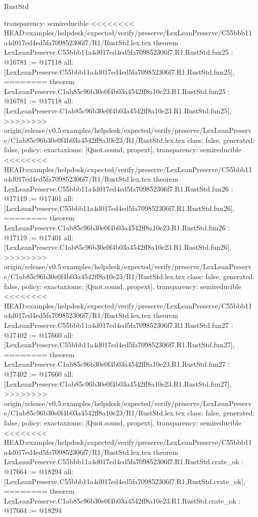 \begin{lexlean}{RustStd}
\begin{coremodule}
{\begin{coremodule}
{{{{{{{{{{{{{{{{{{{{{{{{{{{{  transparency: semireducible
}
<<<<<<<< HEAD:examples/helpdesk/expected/verify/preserve/LexLeanPreserve/C55bbb11a4d017ed4ed5fa709852306f7/R1/RustStd.lex.tex
theorem LexLeanPreserve.C55bbb11a4d017ed4ed5fa709852306f7.R1.RustStd.fun25 : @16781 := @17118 {
  all: [LexLeanPreserve.C55bbb11a4d017ed4ed5fa709852306f7.R1.RustStd.fun25],
========
theorem LexLeanPreserve.C1ab85c96b30e0f4b03a4542ff8a10e23.R1.RustStd.fun25 : @16781 := @17118 {
  all: [LexLeanPreserve.C1ab85c96b30e0f4b03a4542ff8a10e23.R1.RustStd.fun25],
>>>>>>>> origin/release/v0.5:examples/helpdesk/expected/verify/preserve/LexLeanPreserve/C1ab85c96b30e0f4b03a4542ff8a10e23/R1/RustStd.lex.tex
  class: false,
  generated: false,
  policy: exact{axioms: [Quot.sound, propext]},
  transparency: semireducible
}
<<<<<<<< HEAD:examples/helpdesk/expected/verify/preserve/LexLeanPreserve/C55bbb11a4d017ed4ed5fa709852306f7/R1/RustStd.lex.tex
theorem LexLeanPreserve.C55bbb11a4d017ed4ed5fa709852306f7.R1.RustStd.fun26 : @17119 := @17401 {
  all: [LexLeanPreserve.C55bbb11a4d017ed4ed5fa709852306f7.R1.RustStd.fun26],
========
theorem LexLeanPreserve.C1ab85c96b30e0f4b03a4542ff8a10e23.R1.RustStd.fun26 : @17119 := @17401 {
  all: [LexLeanPreserve.C1ab85c96b30e0f4b03a4542ff8a10e23.R1.RustStd.fun26],
>>>>>>>> origin/release/v0.5:examples/helpdesk/expected/verify/preserve/LexLeanPreserve/C1ab85c96b30e0f4b03a4542ff8a10e23/R1/RustStd.lex.tex
  class: false,
  generated: false,
  policy: exact{axioms: [Quot.sound, propext]},
  transparency: semireducible
}
<<<<<<<< HEAD:examples/helpdesk/expected/verify/preserve/LexLeanPreserve/C55bbb11a4d017ed4ed5fa709852306f7/R1/RustStd.lex.tex
theorem LexLeanPreserve.C55bbb11a4d017ed4ed5fa709852306f7.R1.RustStd.fun27 : @17402 := @17660 {
  all: [LexLeanPreserve.C55bbb11a4d017ed4ed5fa709852306f7.R1.RustStd.fun27],
========
theorem LexLeanPreserve.C1ab85c96b30e0f4b03a4542ff8a10e23.R1.RustStd.fun27 : @17402 := @17660 {
  all: [LexLeanPreserve.C1ab85c96b30e0f4b03a4542ff8a10e23.R1.RustStd.fun27],
>>>>>>>> origin/release/v0.5:examples/helpdesk/expected/verify/preserve/LexLeanPreserve/C1ab85c96b30e0f4b03a4542ff8a10e23/R1/RustStd.lex.tex
  class: false,
  generated: false,
  policy: exact{axioms: [Quot.sound, propext]},
  transparency: semireducible
}
<<<<<<<< HEAD:examples/helpdesk/expected/verify/preserve/LexLeanPreserve/C55bbb11a4d017ed4ed5fa709852306f7/R1/RustStd.lex.tex
theorem LexLeanPreserve.C55bbb11a4d017ed4ed5fa709852306f7.R1.RustStd.crate_ok : @17664 := @18294 {
  all: [LexLeanPreserve.C55bbb11a4d017ed4ed5fa709852306f7.R1.RustStd.crate_ok],
========
theorem LexLeanPreserve.C1ab85c96b30e0f4b03a4542ff8a10e23.R1.RustStd.crate_ok : @17664 := @18294 {
}}}}}}}}}}}}}}}}}}}}}}}}}}}}}}}}
\end{coremodule}}
\end{coremodule}
\end{lexlean}
